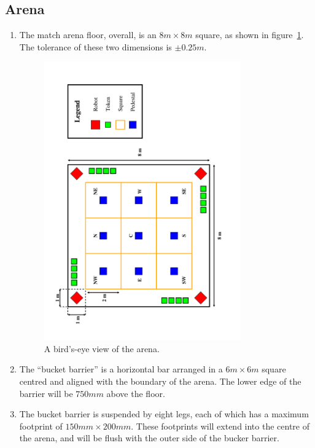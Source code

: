 \subsection{Arena}
\label{sub:arena}
\begin{enumerate}
\item The match arena floor, overall, is an $8m \times 8m$ square, as shown in figure~\ref{fig:arena-dim}.  The tolerance of these two dimensions is $\pm0.25m$.

\begin{figure}
  \centering
  \includegraphics[width=0.8\textwidth]{./images/arena.pdf}
  \caption{\label{fig:arena-dim}A bird's-eye view of the arena.}
\end{figure}

\item The ``bucket barrier'' is a horizontal bar arranged in a $6m \times 6m$ square centred and aligned with the boundary of the arena.  The lower edge of the barrier will be $750mm$ above the floor.

\item The bucket barrier is suspended by eight legs, each of which has a maximum footprint of $150mm \times 200mm$.  These footprints will extend into the centre of the arena, and will be flush with the outer side of the bucker barrier.


\end{enumerate}
